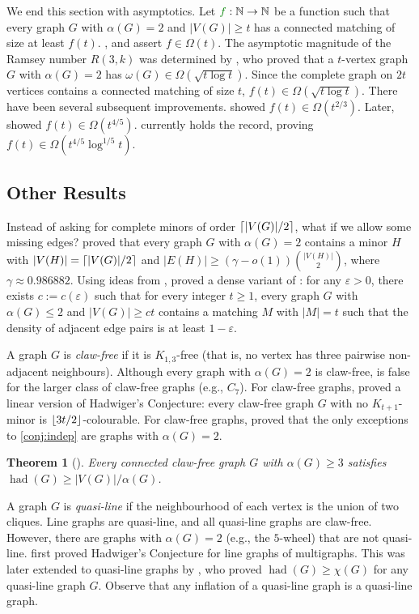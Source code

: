 \documentclass[11pt]{article}
\numberwithin{equation}{section}
\theoremstyle{plain}
\newtheorem{thm}[equation]{Theorem}
\theoremstyle{definition}
\DeclarePairedDelimiter{\floor}{\lfloor}{\rfloor}
\DeclarePairedDelimiter{\ceil}{\lceil}{\rceil}
\renewcommand{\geq}{\geqslant}
\renewcommand{\leq}{\leqslant}
\DeclareMathOperator{\had}{had}
\newcommand{\N}{\mathbb{N}}
\newcommand{\defn}[1]{\textcolor{green!50!black}{\textit{#1}}}
\newcommand{\mathdefn}[1]{\textcolor{green!50!black}{#1}}
\begin{document}
We end this section with asymptotics. Let $\mathdefn{f}: \N \to \N$ be a function such that every graph $G$ with $\alpha(G) = 2$ and $|V(G)| \geq t$ has a connected matching of size at least $f(t)$. ,  and  assert $f \in \Omega(t)$. The asymptotic magnitude of the Ramsey number $R(3,k)$ was determined by \citet{Kim95}, who proved that a $t$-vertex graph $G$ with $\alpha(G) = 2$ has $\omega(G) \in \Omega(\sqrt{t \log t})$. Since the complete graph on $2t$ vertices contains a connected matching of size $t$, $f(t) \in \Omega(\sqrt{t \log t})$. There have been several subsequent improvements. \citet{furedi2005connected} showed $f(t) \in \Omega(t^{2/3})$. Later, \citet{Blasiak07} showed $f(t) \in \Omega(t^{4/5})$. \citet{Fox10} currently holds the record, proving $f(t) \in \Omega(t^{4/5} \log^{1/5}t)$.

\subsection{Other Results}
Instead of asking for complete minors of order $\ceil{|V(G)|/ 2}$, what if we allow some missing edges? \citet{NS26a} proved that every graph $G$ with $\alpha(G) = 2$ contains a minor $H$ with $|V(H)| = \ceil{|V(G)|/ 2}$ and  $ |E(H)| \geq (\gamma - o(1)) \binom{|V(H)|}{2}$, where $\gamma \approx 0.986882$. Using ideas from \citep{NS26a}, \citet{yip2025dense} proved a dense variant of : for any $\varepsilon > 0$, there exists $c := c(\varepsilon)$ such that for every integer $t \geq 1$, every graph $G$ with $\alpha(G) \leq 2$ and $|V(G)| \geq ct$ contains a matching $M$ with $|M| = t$ such that the density of adjacent edge pairs is at least $1 - \varepsilon$.

A graph $G$ is \defn{claw-free} if it is $K_{1,3}$-free (that is, no vertex has three pairwise non-adjacent neighbours). Although every graph with $\alpha(G) = 2$ is claw-free,  is false for the larger class of claw-free graphs (e.g., $C_7$). For claw-free graphs, \citet{chudnovsky_approximate_2010} proved a linear version of Hadwiger's Conjecture: every claw-free graph $G$ with no $K_{t+1}$-minor is $\floor{3t/2}$-colourable. For claw-free graphs, \citet{FradkinClique12} proved that the only exceptions to \cref{conj:indep} are graphs with $\alpha(G) = 2$.
\begin{thm}[\citet{FradkinClique12}]
    Every connected claw-free graph $G$ with $\alpha(G) \geq 3$ satisfies $\had(G) \geq |V(G)|/\alpha(G)$.
\end{thm}
A graph $G$ is \defn{quasi-line} if the neighbourhood of each vertex is the union of two cliques. Line graphs are quasi-line, and all quasi-line graphs are claw-free. However, there are graphs with $\alpha(G) = 2$ (e.g., the $5$-wheel) that are not quasi-line. \citet{reed_hadwigers_2004} first proved Hadwiger’s Conjecture for line graphs of multigraphs. This was later extended to quasi-line graphs by \citet{CO08}, who proved $\had(G) \geq \chi(G)$ for any quasi-line graph $G$. Observe that any inflation of a quasi-line graph is a quasi-line graph.
\end{document}
